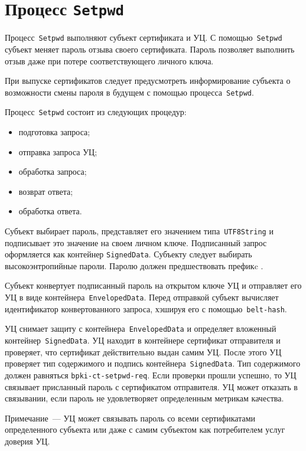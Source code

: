 \section{Процесс \texttt{Setpwd}}\label{PROCESSES.Setpwd}

Процесс~\texttt{Setpwd} выполняют субъект сертификата и УЦ.
С помощью~\texttt{Setpwd} субъект меняет пароль отзыва своего 
сертификата. Пароль позволяет выполнить отзыв даже при потере 
соответствующего личного ключа.

При выпуске сертификатов следует предусмотреть информирование субъекта 
о возможности смены пароля в будущем с помощью процесса~\texttt{Setpwd}.

Процесс~\texttt{Setpwd} состоит из следующих процедур:
\begin{itemize}
\item
подготовка запроса;
\item
отправка запроса УЦ;
\item
обработка запроса;
\item
возврат ответа;
\item
обработка ответа.
\end{itemize}

Субъект выбирает пароль, представляет его значением типа~\texttt{UTF8String}
и подписывает это значение на своем личном ключе.
Подписанный запрос оформляется как контейнер \texttt{SignedData}.
%
Субъекту следует выбирать высокоэнтропийные пароли. 
Паролю должен предшествовать префикc .

Субъект конвертует подписанный пароль на открытом ключе УЦ
и отправляет его УЦ в виде контейнера~\texttt{EnvelopedData}.
Перед отправкой субъект вычисляет идентификатор конвертованного запроса,
хэшируя его с помощью~\texttt{belt-hash}.

УЦ снимает защиту с контейнера~\texttt{EnvelopedData} и определяет 
вложенный контейнер~\texttt{SignedData}. УЦ находит в контейнере
сертификат отправителя и проверяет, что сертификат действительно 
выдан самим УЦ. После этого УЦ проверяет тип содержимого и подпись 
контейнера~\texttt{SignedData}. Тип содержимого должен равняться
\texttt{bpki-ct-setpwd-req}. Если проверки прошли успешно, то УЦ  
связывает присланный пароль с сертификатом отправителя. УЦ может отказать 
в связывании, если пароль не удовлетворяет определенным метрикам качества.

\begin{note}
Примечание~--- УЦ может связывать пароль со всеми сертификатами
определенного субъекта или даже с самим субъектом как потребителем услуг
доверия УЦ.
\end{note}

